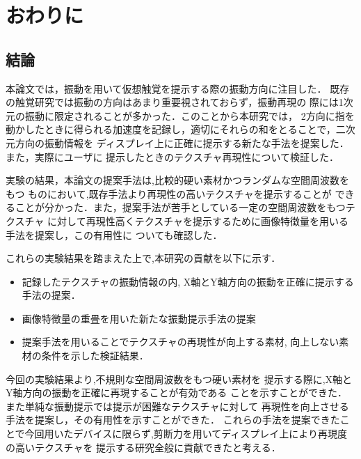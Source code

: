 \chapter{おわりに}

\section{結論}
本論文では，振動を用いて仮想触覚を提示する際の振動方向に注目した．
既存の触覚研究では振動の方向はあまり重要視されておらず，振動再現の
際には1次元の振動に限定されることが多かった．このことから本研究では，
2方向に指を動かしたときに得られる加速度を記録し，適切にそれらの和をとることで，二次元方向の振動情報を
ディスプレイ上に正確に提示する新たな手法を提案した．また，実際にユーザに
提示したときのテクスチャ再現性について検証した．\par
実験の結果，本論文の提案手法は,比較的硬い素材かつランダムな空間周波数をもつ
ものにおいて,既存手法より再現性の高いテクスチャを提示することが
できることが分かった．また，提案手法が苦手としている一定の空間周波数をもつテクスチャ
に対して再現性高くテクスチャを提示するために画像特徴量を用いる手法を提案し，この有用性に
ついても確認した．
\par
これらの実験結果を踏まえた上で,本研究の貢献を以下に示す．
\begin{itemize}
  \item 記録したテクスチャの振動情報の内,
  X軸とY軸方向の振動を正確に提示する手法の提案．
　\item 画像特徴量の重畳を用いた新たな振動提示手法の提案
  \item 提案手法を用いることでテクスチャの再現性が向上する素材,
  向上しない素材の条件を示した検証結果．
  
\end{itemize}
今回の実験結果より,不規則な空間周波数をもつ硬い素材を
提示する際に,X軸とY軸方向の振動を正確に再現することが有効である
ことを示すことができた．
また単純な振動提示では提示が困難なテクスチャに対して
再現性を向上させる手法を提案し，その有用性を示すことができた．
これらの手法を提案できたことで今回用いたデバイスに限らず,剪断力を用いてディスプレイ上により再現度の高いテクスチャを
提示する研究全般に貢献できたと考える．


